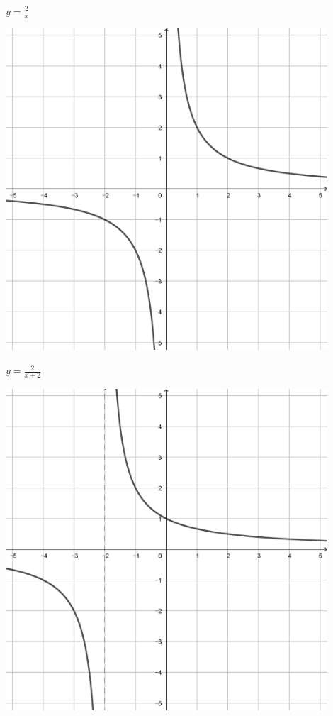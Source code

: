 \documentclass[a4paper]{oblivoir}
\begin{document}
\clearpage
\begin{minipage}{0.45\textwidth}\centering
\(y=\frac2x\)
\par\bigskip\includegraphics[width=0.9\textwidth]{img/4_rational_6}
\end{minipage}
\begin{minipage}{0.45\textwidth}\centering
\(y=\frac2{x+2}\)
\par\bigskip\includegraphics[width=0.9\textwidth]{img/4_rational_7}
\end{minipage}\bigskip\bigskip\par
\end{document}
